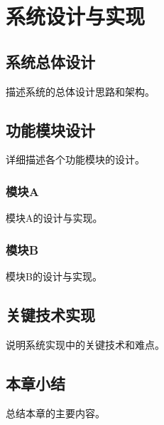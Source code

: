 \chapter{系统设计与实现}

\section{系统总体设计}

描述系统的总体设计思路和架构。

\section{功能模块设计}

详细描述各个功能模块的设计。

\subsection{模块A}

模块A的设计与实现。

\subsection{模块B}

模块B的设计与实现。

\section{关键技术实现}

说明系统实现中的关键技术和难点。

\section{本章小结}

总结本章的主要内容。
